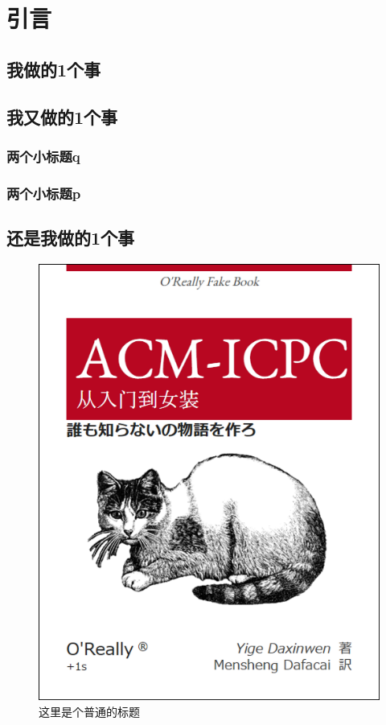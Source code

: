 \chapter{引言}
\blindtext\cite{NWPUThesisLaTeXTemplate}
\section{我做的1个事}
\blindtext\cite{knuth1986the}\cite{lamport1989latex:}
\section{我又做的1个事}
\blindtext
\subsection{两个小标题q}
\blindtext
\subsection{两个小标题p}
\blindtext
\section{还是我做的1个事}
\blindtext
\begin{figure}[ht]
	\centering
	\includegraphics[scale=0.6]{figures/figure1.png}
	\caption{
		这里是个普通的标题
	}
	\label{fig:example}
\end{figure}
\endinput